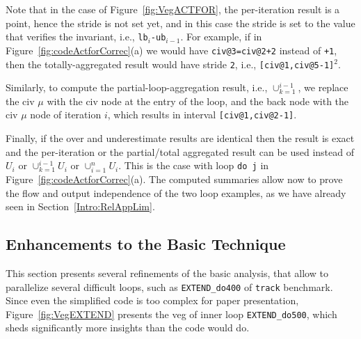 \documentclass{sig-alternate}
\begin{document}
Note that in the case of Figure~\ref{fig:VegACTFOR},
the per-iteration result is a point, hence the stride is not set yet, and in
this case the stride is set to the value that verifies the invariant,
i.e., {\tt lb$_i$-ub$_{i-1}$}.
For example, if in Figure~\ref{fig:codeActforCorrec}(a) we would have 
{\tt civ@3=civ@2+2} instead of {\tt +1}, then the totally-aggregated
result would have stride {\tt 2}, i.e., {\tt [civ@1,civ@5-1]$^2$}.

Similarly, to compute the partial-loop-aggregation result, i.e., $\cup_{k=1}^{i-1}$,
we replace the {\sc civ} $\mu$ with the {\sc civ} node at the entry of the loop,
and the back node with the {\sc civ} $\mu$ node of iteration $i$, 
which results in interval {\tt[civ@1,civ@2-1]}.

Finally, if the over and underestimate results are identical then the result is
exact and the per-iteration or the partial/total aggregated result can be used
instead of $U_i$ or $\cup_{k=1}^{i-1} U_i$ or $\cup_{i=1}^n U_i$.  This is the
case with loop {\tt do j} in Figure~\ref{fig:codeActforCorrec}(a).  
%
The computed summaries allow now to prove the flow and output independence of the 
two loop examples, as we have already seen in Section~\ref{Intro:RelAppLim}.

\enlargethispage{\baselineskip}

\subsection{Enhancements to the Basic Technique}
\label{subsec:Track}


This section presents several refinements of the basic analysis,
that allow to parallelize several difficult loops, such as {\tt EXTEND\_do400} 
of {\tt track} benchmark. Since even the simplified code
is too complex for paper presentation, Figure~\ref{fig:VegEXTEND} presents the 
{\sc veg} of inner loop {\tt EXTEND\_do500}, which sheds significantly more 
insights than the code would do.
\end{document}
